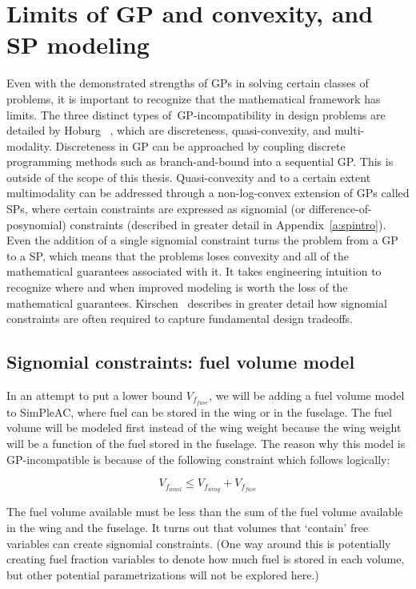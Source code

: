 \section{Limits of GP and convexity, and SP modeling}
\label{s:GPlimits}

Even with the demonstrated strengths of \gls{GP}s in solving certain classes of
problems, it is important to recognize that the mathematical framework has limits.
The three distinct types of~\gls{GP}-incompatibility in design problems are detailed
by Hoburg~ \cite{hoburg_thesis}, which are discreteness,
quasi-convexity, and multi-modality. Discreteness in \gls{GP} can be approached
by coupling discrete programming methods such as branch-and-bound into a sequential
\gls{GP}. This is outside of the scope of this thesis.
Quasi-convexity and to a certain extent multimodality can
be addressed through a non-log-convex extension of \gls{GP}s called \gls{SP}s, where
certain constraints are expressed as signomial (or difference-of-posynomial) constraints
(described in greater detail in Appendix~\ref{a:spintro}).
Even the addition of a single
signomial constraint turns the problem from a \gls{GP} to a \gls{SP}, which means
that the problems loses convexity and all of the mathematical guarantees associated with it. 
It takes engineering intuition to recognize where and when improved modeling is worth
the loss of the mathematical guarantees. Kirschen~\cite{kirschen_thesis} describes in greater
detail how
signomial constraints are often required to capture fundamental design tradeoffs.

\subsection{Signomial constraints: fuel volume model}
\label{s:fuel}

In an attempt to put a lower bound $V_{f_{fuse}}$, we will
be adding a fuel volume model to SimPleAC, where fuel can be stored in the wing or
in the fuselage. The fuel volume will be modeled first instead of the wing
weight because the wing weight will be a function of the fuel stored in the fuselage.
The reason why this model is \gls{GP}-incompatible is because of the
following constraint which follows logically:

\begin{equation}
	V_{f_{avail}} \leq V_{f_{wing}} + V_{f_{fuse}}
	\label{vfavail}
\end{equation}

The fuel volume available must be less than the sum of the fuel volume available in the
wing and the fuselage. It turns out that volumes that `contain' free variables
can create signomial constraints. (One way around this is potentially creating fuel
fraction variables to denote how much fuel is stored in each volume, but
other potential parametrizations will not be explored here.)

